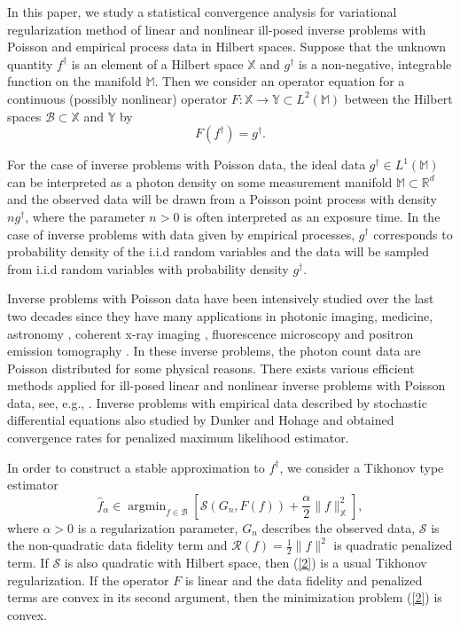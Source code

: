 \documentclass[10pt]{iopart}
\DeclareMathOperator*{\argmin}{argmin}
\begin{document}
\hspace{0.5cm}
In this paper, we study a statistical convergence analysis for variational regularization method of linear and nonlinear ill-posed inverse 
problems with Poisson and empirical process data in Hilbert spaces. Suppose that the unknown quantity $f^{\dagger}$ is an 
element of a Hilbert space $\mathbb{X}$ and $g^{\dagger}$ is a non-negative, integrable function on the manifold $\mathbb{M}$.
Then we consider an operator equation for a continuous (possibly nonlinear) operator $F: \mathbb{X}\rightarrow 
\mathbb{Y}\subset L^{2}(\mathbb{M})$ between the Hilbert spaces $\mathcal{B}\subset\mathbb{X}$ and $\mathbb{Y}$ by
\begin{equation}\label{1}
F(f^{\dagger})=g^{\dagger}.
\end{equation}

For the case of inverse problems with Poisson data, the ideal data $g^{\dagger}\in L^{1}(\mathbb{M})$ can be interpreted as a photon 
density on some measurement manifold $\mathbb{M}\subset\mathbb{R}^{d}$ and the observed data will be drawn from a Poisson point process with 
density $ng^{\dagger}$, where the parameter $n>0$ is often interpreted as an exposure time. In the case of inverse problems with
data given by empirical processes, $g^{\dagger}$ corresponds to probability density of the i.i.d random variables and the data will be sampled 
from i.i.d random variables with probability density $g^{\dagger}$.

Inverse problems with Poisson data have been intensively studied over the last two decades since they have many applications in photonic imaging,
medicine, astronomy \cite{Bertero2009}, coherent x-ray imaging \cite{Hohage2013}, fluorescence microscopy and positron emission tomography 
\cite{Cavalier2002, Vardi1985}. In these inverse problems, the photon count data are Poisson distributed for some physical reasons. 
There exists various efficient methods applied for ill-posed linear and nonlinear inverse problems with Poisson data, see, e.g., 
\cite{antoniadis2006, Benning2011, Bertero2009, Cavalier2002, Hohage2016, Hohage2013, Munk2009, Werner2012}. Inverse problems 
with empirical data described by stochastic differential equations also studied by Dunker and Hohage \cite{Dunker2014} and
obtained convergence rates for penalized maximum likelihood estimator. 

In order to construct a stable approximation to $f^{\dagger}$, we consider a Tikhonov type estimator 
\begin{equation}\label{2}
\widehat{f}_{\alpha}\in \argmin_{f\in\mathcal{B}}\left[\mathcal{S}(G_{n}, F(f))+\frac{\alpha}{2}\|f\|_{\mathbb{X}}^{2}\right], 
\end{equation}
where $\alpha>0$ is a regularization parameter, $G_{n}$ describes the observed data, $\mathcal{S}$ is the non-quadratic data 
fidelity term and $\mathcal{R}(f)=\frac{1}{2}\|f\|^{2}$ is quadratic penalized term. If $\mathcal{S}$ is also quadratic with Hilbert space,
then (\ref{2}) is a usual Tikhonov regularization. If the operator $F$ is linear and the data fidelity and penalized terms are convex in
its second argument, then the minimization problem (\ref{2}) is convex.  
\end{document}
